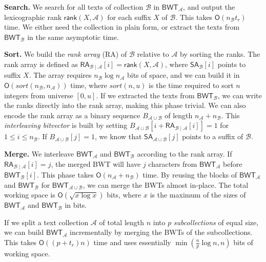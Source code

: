 \documentclass[smallabstract,smallcaptions]{dccpaper}
\newcommand{\Oh}{\ensuremath{\mathsf{O}}}
\newcommand{\BWT}{\textsf{BWT}}
\newcommand{\RA}{\textsf{RA}}
\newcommand{\mSA}{\ensuremath{\mathsf{SA}}}
\newcommand{\mBWT}{\ensuremath{\mathsf{BWT}}}
\newcommand{\mRA}{\ensuremath{\mathsf{RA}}}
\newcommand{\mrank}{\ensuremath{\mathsf{rank}}}
\newcommand{\Acoll}{\ensuremath{\mathcal{A}}}
\newcommand{\Bcoll}{\ensuremath{\mathcal{B}}}
\begin{document}
\smallbreak\noindent\textbf{Search.} We search for all texts of collection $\Bcoll$ in $\mBWT_{\Acoll}$, and output the lexicographic rank $\mrank(X, \Acoll)$ for each suffix $X$ of $\Bcoll$. This takes $\Oh(n_{\Bcoll} t_{r})$ time. We either need the collection in plain form, or extract the texts from $\mBWT_{\Bcoll}$ in the same asymptotic time.

\smallbreak\noindent\textbf{Sort.} We build the \emph{rank array} (\RA) of $\Bcoll$ relative to $\Acoll$ by sorting the ranks. The rank array is defined as $\mRA_{\Bcoll \mid \Acoll}[i] = \mrank(X, \Acoll)$, where $\mSA_{\Bcoll}[i]$ points to suffix $X$. The array requires $n_{\Bcoll} \log n_{\Acoll}$ bits of space, and we can build it in $\Oh(sort(n_{\Bcoll}, n_{\Acoll}))$ time, where $sort(n, u)$ is the time required to sort $n$ integers from universe $[0,u]$. If we extracted the texts from $\mBWT_{\Bcoll}$, we can write the ranks directly into the rank array, making this phase trivial. We can also encode the rank array as a binary sequence $B_{\Acoll \cup \Bcoll}$ of length $n_{\Acoll} + n_{\Bcoll}$. This \emph{interleaving bitvector} is built by setting $B_{\Acoll \cup \Bcoll}[i + \mRA_{\Bcoll \mid \Acoll}[i]] = 1$ for $1 \le i \le n_{\Bcoll}$. If $B_{\Acoll \cup \Bcoll}[j] = 1$, we know that $\mSA_{\Acoll \cup \Bcoll}[j]$ points to a suffix of $\Bcoll$.

\smallbreak\noindent\textbf{Merge.} We interleave $\mBWT_{\Acoll}$ and $\mBWT_{\Bcoll}$ according to the rank array. If $\mRA_{\Bcoll \mid \Acoll}[i] = j$, the merged \BWT{} will have $j$ characters from $\mBWT_{\Acoll}$ before $\mBWT_{\Bcoll}[i]$. This phase takes $\Oh(n_{\Acoll} + n_{\Bcoll})$ time. By reusing the blocks of $\mBWT_{\Acoll}$ and $\mBWT_{\Bcoll}$ for $\mBWT_{\Acoll \cup \Bcoll}$, we can merge the \BWT{}s almost in-place. The total working space is $\Oh(\sqrt{x \log x})$ bits, where $x$ is the maximum of the sizes of $\mBWT_{\Acoll}$ and $\mBWT_{\Bcoll}$ in bits.


\Section{Large-scale \BWT{} merging}

If we split a text collection $\Acoll$ of total length $n$ into $p$ \emph{subcollections} of equal size, we can build $\mBWT_{\Acoll}$ incrementally by merging the \BWT{}s of the subcollections. This takes $\Oh((p+t_{r})n)$ time and uses essentially $\min(\frac{n}{p} \log n, n)$ bits of working space.
\end{document}
